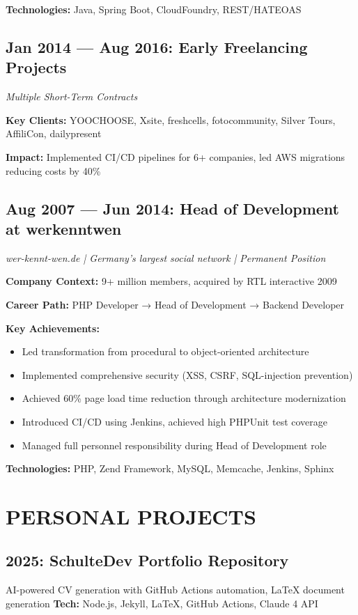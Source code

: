 \documentclass[10pt,a4paper]{article}
\newenvironment{compactlist}{\begin{itemize}[leftmargin=1em,itemsep=0pt,parsep=0pt,topsep=0pt,partopsep=0pt]}{\end{itemize}}
\begin{document}
\textbf{Technologies:} Java, Spring Boot, CloudFoundry, REST/HATEOAS

\subsection{Jan 2014 — Aug 2016: Early Freelancing Projects}
\textit{Multiple Short-Term Contracts}

\textbf{Key Clients:} YOOCHOOSE, Xsite, freshcells, fotocommunity, Silver Tours, AffiliCon, dailypresent

\textbf{Impact:} Implemented CI/CD pipelines for 6+ companies, led AWS migrations reducing costs by 40\%

\subsection{Aug 2007 — Jun 2014: Head of Development at werkenntwen}
\textit{wer-kennt-wen.de | Germany's largest social network | Permanent Position}

\textbf{Company Context:} 9+ million members, acquired by RTL interactive 2009

\textbf{Career Path:} PHP Developer → Head of Development → Backend Developer

\textbf{Key Achievements:}
\begin{compactlist}
\item Led transformation from procedural to object-oriented architecture
\item Implemented comprehensive security (XSS, CSRF, SQL-injection prevention)
\item Achieved 60\% page load time reduction through architecture modernization
\item Introduced CI/CD using Jenkins, achieved high PHPUnit test coverage
\item Managed full personnel responsibility during Head of Development role
\end{compactlist}

\textbf{Technologies:} PHP, Zend Framework, MySQL, Memcache, Jenkins, Sphinx

\section{PERSONAL PROJECTS}

\subsection{2025: SchulteDev Portfolio Repository}
AI-powered CV generation with GitHub Actions automation, LaTeX document generation
\textbf{Tech:} Node.js, Jekyll, LaTeX, GitHub Actions, Claude 4 API
\end{document}
